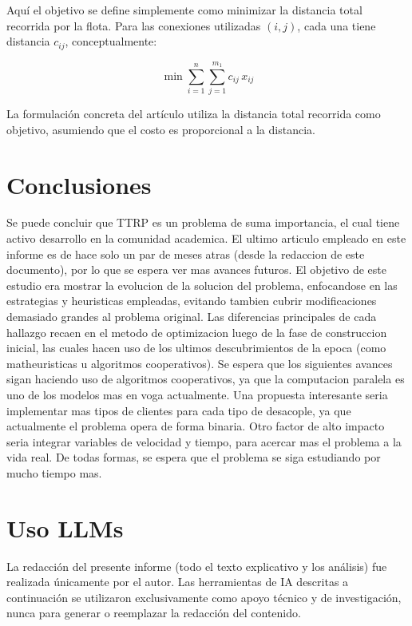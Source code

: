 \documentclass[letter, 10pt]{article}
\begin{document}
Aqu\'i el objetivo se define simplemente como minimizar la distancia total recorrida por la flota. Para las conexiones utilizadas $(i,j)$, cada una tiene distancia $c_{ij}$, conceptualmente:

\begin{equation}
\min \sum_{i=1}^{n} \sum_{j=1}^{m_1} c_{ij} \, x_{ij}
\end{equation}

La formulaci\'on concreta del art\'iculo utiliza la distancia total recorrida como objetivo, asumiendo que el costo es proporcional a la distancia.

\section{Conclusiones}
Se puede concluir que TTRP es un problema de suma importancia, el cual tiene activo desarrollo en la comunidad academica. El ultimo articulo empleado en este
informe es de hace solo un par de meses atras (desde la redaccion de este documento), por lo que se espera ver mas avances futuros. El objetivo de este estudio
era mostrar la evolucion de la solucion del problema, enfocandose en las estrategias y heuristicas empleadas, evitando tambien cubrir modificaciones demasiado
grandes al problema original. Las diferencias principales de cada hallazgo recaen en el metodo de optimizacion luego de la fase de construccion inicial, las
cuales hacen uso de los ultimos descubrimientos de la epoca (como matheuristicas u algoritmos cooperativos). Se espera que los siguientes avances sigan haciendo
uso de algoritmos cooperativos, ya que la computacion paralela es uno de los modelos mas en voga actualmente. Una propuesta interesante seria implementar mas tipos
de clientes para cada tipo de desacople, ya que actualmente el problema opera de forma binaria. Otro factor de alto impacto seria integrar variables de velocidad
y tiempo, para acercar mas el problema a la vida real. De todas formas, se espera que el problema se siga estudiando por mucho tiempo mas.

\section{Uso LLMs}

La redacci\'on del presente informe (todo el texto explicativo y los an\'alisis) fue realizada \'unicamente por el autor. Las herramientas de IA descritas a continuaci\'on se utilizaron exclusivamente como apoyo t\'ecnico y de investigaci\'on, nunca para generar o reemplazar la redacci\'on del contenido.
\end{document}

